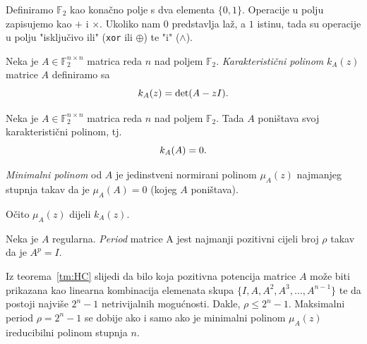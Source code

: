 \documentclass[10pt]{scrartcl}
\newcommand{\charpol}[2]{k_{#1}(#2)}
\newcommand{\minpol}[2]{\mu_{#1}(#2)}
\newcommand{\poljef}{\mathbb{F}_2}
\begin{document}
\begin{napomena}
Definiramo $\poljef$ kao konačno polje s dva elementa $\{0,1\}$. Operacije u polju zapisujemo kao $+$ i $\times$. Ukoliko nam $0$ predstavlja laž, a $1$ istinu, tada su operacije u polju "isključivo ili" (\texttt{xor} ili $\oplus$) te "i" ($\wedge$).
\end{napomena}
\begin{definicija}
Neka je $A \in \poljef^{n\times n}$ matrica reda $n$ nad poljem $\poljef$. \emph{Karakteristični polinom} $\charpol{A}{z}$ matrice $A$ definiramo sa
\begin{equation}
    \charpol{A}{z} = \det(A-zI)\text.
\end{equation}
\end{definicija}
\begin{teorem}\label{tm:HC}
Neka je $A \in \poljef^{n\times n}$ matrica reda $n$ nad poljem $\poljef$. Tada $A$ poništava svoj karakteristični polinom, tj.\
\begin{equation}
    \charpol{A}{A} = 0\text.
\end{equation}
\end{teorem}
\begin{definicija}
\emph{Minimalni polinom} od $A$ je jedinstveni normirani polinom $\minpol{A}{z}$ najmanjeg stupnja takav da je $\minpol{A}{A}=0$ (kojeg $A$ poništava).
\end{definicija}
\begin{napomena}
Očito $\minpol{A}{z}$ dijeli $\charpol{A}{z}$.
\end{napomena}
\begin{definicija}
Neka je $A$ regularna. \emph{Period} matrice A jest najmanji pozitivni cijeli broj $\rho$ takav da je $A^p = I$.
\end{definicija}
\begin{napomena}\label{nap:ired}
Iz teorema~\ref{tm:HC} slijedi da bilo koja pozitivna potencija matrice $A$ može biti prikazana kao linearna kombinacija elemenata skupa $\{I, A, A^2, A^3, \dots, A^{n-1}\}$ te da postoji najviše $2^n -1$ netrivijalnih mogućnosti. Dakle, $\rho \leq 2^n -1$. Maksimalni period $\rho = 2^n -1$ se dobije ako i samo ako je minimalni polinom $\minpol{A}{z}$ ireducibilni polinom stupnja $n$.
\end{napomena}
\end{document}
